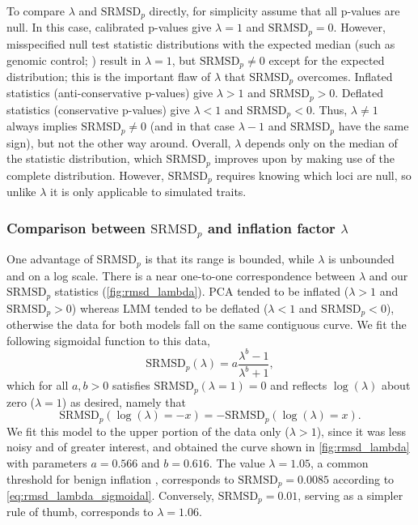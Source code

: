 \documentclass[11pt]{article}
\newcommand{\rmsd}{\text{SRMSD}_p}
\begin{document}
To compare $\lambda$ and $\rmsd$ directly, for simplicity assume that all p-values are null.
In this case, calibrated p-values give $\lambda = 1$ and $\rmsd = 0$.
However, misspecified null test statistic distributions with the expected median (such as genomic control; \citet{devlin_genomic_1999}) result in $\lambda = 1$, but $\rmsd \ne 0$ except for the expected distribution; this is the important flaw of $\lambda$ that $\rmsd$ overcomes.
Inflated statistics (anti-conservative p-values) give $\lambda > 1$ and $\rmsd > 0$.
Deflated statistics (conservative p-values) give $\lambda < 1$ and $\rmsd < 0$.
Thus, $\lambda \ne 1$ always implies $\rmsd \ne 0$ (and in that case $\lambda - 1$ and $\rmsd$ have the same sign), but not the other way around.
Overall, $\lambda$ depends only on the median of the statistic distribution, which $\rmsd$ improves upon by making use of the complete distribution.
However, $\rmsd$ requires knowing which loci are null, so unlike $\lambda$ it is only applicable to simulated traits.

\subsubsection{Comparison between $\rmsd$ and inflation factor $\lambda$}

One advantage of $\rmsd$ is that its range is bounded, while $\lambda$ is unbounded and on a log scale.
There is a near one-to-one correspondence between $\lambda$ and our $\rmsd$ statistics (\cref{fig:rmsd_lambda}).
PCA tended to be inflated ($\lambda > 1$ and $\rmsd > 0$) whereas LMM tended to be deflated ($\lambda < 1$ and $\rmsd < 0$), otherwise the data for both models fall on the same contiguous curve.
We fit the following sigmoidal function to this data,
\begin{equation}
  \label{eq:rmsd_lambda_sigmoidal}
  \rmsd( \lambda ) = a \frac{ \lambda^b - 1 }{ \lambda^b + 1 },
\end{equation}
which for all $a,b > 0$ satisfies $\rmsd( \lambda = 1 ) = 0$ and reflects $\log( \lambda )$ about zero ($\lambda = 1$) as desired, namely that
$$
\rmsd( \log( \lambda ) = -x ) = - \rmsd( \log( \lambda ) = x ).
$$
We fit this model to the upper portion of the data only ($\lambda > 1$), since it was less noisy and of greater interest, and obtained the curve shown in \cref{fig:rmsd_lambda} with parameters $a = 0.566$ and $b = 0.616$.
The value $\lambda = 1.05$, a common threshold for benign inflation \citep{price_new_2010}, corresponds to $\rmsd = 0.0085$ according to \cref{eq:rmsd_lambda_sigmoidal}.
Conversely, $\rmsd = 0.01$, serving as a simpler rule of thumb, corresponds to $\lambda = 1.06$.
\end{document}
